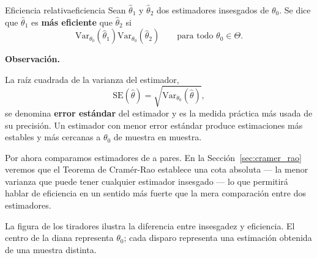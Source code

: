 \documentclass[12pt, a4paper]{book}
\newenvironment{observacion}{%
    \par\medskip\noindent\textbf{\color{azul}Observaci\'{o}n.}\enspace\itshape
}{\par\medskip}
\numberwithin{equation}{chapter}
\begin{document}
\begin{definicion}{Eficiencia relativa}{eficiencia}
	Sean $\hat{\theta}_1$ y $\hat{\theta}_2$ dos estimadores
	insesgados de $\theta_0$. Se dice que $\hat{\theta}_1$
	es \textbf{más eficiente} que $\hat{\theta}_2$ si
	\[
	\mathrm{Var}_{\theta_0}(\hat{\theta}_1) 
	\mathrm{Var}_{\theta_0}(\hat{\theta}_2)
	\qquad \text{para todo } \theta_0 \in \Theta.
	\]
\end{definicion}

\begin{observacion}
	La raíz cuadrada de la varianza del estimador,
	\[
	\mathrm{SE}(\hat{\theta}) =
	\sqrt{\mathrm{Var}_{\theta_0}(\hat{\theta})},
	\]
	se denomina \textbf{error estándar} del estimador y es
	la medida práctica más usada de su precisión. Un
	estimador con menor error estándar produce estimaciones
	más estables y más cercanas a $\theta_0$ de muestra
	en muestra.
	
	Por ahora comparamos estimadores de a pares. En la
	Sección~\ref{sec:cramer_rao} veremos que el Teorema de
	Cramér-Rao establece una cota absoluta --- la menor
	varianza que puede tener cualquier estimador insesgado
	--- lo que permitirá hablar de eficiencia en un sentido
	más fuerte que la mera comparación entre dos
	estimadores.
\end{observacion}

La figura de los tiradores ilustra la diferencia entre
insesgadez y eficiencia. El centro de la diana representa
$\theta_0$; cada disparo representa una estimación obtenida
de una muestra distinta.
\end{document}
